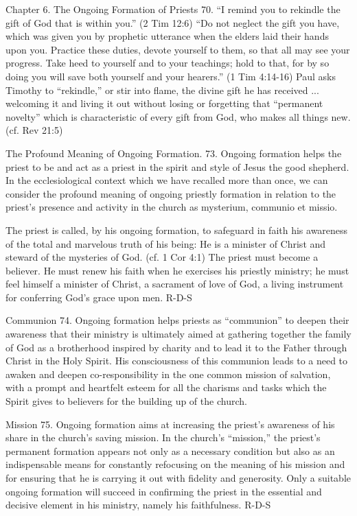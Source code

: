 \documentclass[oneside]{book}
\begin{document}
Chapter 6. The Ongoing Formation of Priests
70. ``I remind you to rekindle the gift of God that is within you.'' (2 Tim
12:6) ``Do not neglect the gift you have, which was given you by prophetic
utterance when the elders laid their hands upon you. Practice these duties,
devote yourself to them, so that all may see your progress. Take heed to
yourself and to your teachings; hold to that, for by so doing you will save both
yourself and your hearers.'' (1 Tim 4:14-16) Paul asks Timothy to ``rekindle,''
or stir into flame, the divine gift he has received ... welcoming it and living
it out without losing or forgetting that ``permanent novelty'' which is
characteristic of every gift from God, who makes all things new. (cf. Rev 21:5)

The Profound Meaning of Ongoing Formation.
73. Ongoing formation helps the priest to be and act as a priest in the spirit
and style of Jesus the good shepherd. In the ecclesiological context which we
have recalled more than once, we can consider the profound meaning of ongoing
priestly formation in relation to the priest's presence and activity in the
church as mysterium, communio et missio.

The priest is called, by his ongoing formation, to safeguard in faith his
awareness of the total and marvelous truth of his being: He is a minister of
Christ and steward of the mysteries of God. (cf. 1 Cor 4:1) The priest must
become a believer. He must renew his faith when he exercises his priestly
ministry; he must feel himself a minister of Christ, a sacrament of love of God,
a living instrument for conferring God's grace upon men.
R-D-S

Communion
74. Ongoing formation helps priests as ``communion'' to deepen their awareness
that their ministry is ultimately aimed at gathering together the family of God
as a brotherhood inspired by charity and to lead it to the Father through Christ
in the Holy Spirit. His consciousness of this communion leads to a need to
awaken and deepen co-responsibility in the one common mission of salvation, with
a prompt and heartfelt esteem for all the charisms and tasks which the Spirit
gives to believers for the building up of the church.

Mission
75. Ongoing formation aims at increasing the priest's awareness of his share in
the church's saving mission. In the church's ``mission,'' the priest's permanent
formation appears not only as a necessary condition but also as an indispensable
means for constantly refocusing on the meaning of his mission and for ensuring
that he is carrying it out with fidelity and generosity. Only a suitable ongoing
formation will succeed in confirming the priest in the essential and decisive
element in his ministry, namely his faithfulness.
R-D-S
\end{document}
